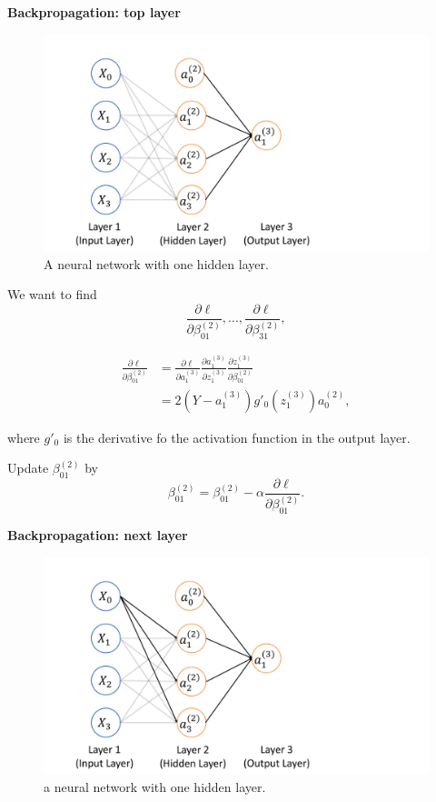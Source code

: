 \documentclass[]{book}
\begin{document}
\textbf{Backpropagation: top layer}

\begin{figure}

{\centering \includegraphics[width=0.5\linewidth]{figures/back_1} 

}

\caption{A neural network with one hidden layer.}\label{fig:back1}
\end{figure}

We want to find \[
\frac{\partial \ell}{\partial \beta_{01}^{(2)}}, \ldots, \frac{\partial \ell}{\partial \beta_{31}^{(2)}},
\]

\begin{align*}
\frac{\partial \ell}{\partial \beta_{01}^{(2)}} & = \frac{\partial \ell}{\partial a_1^{(3)}}
\frac{\partial a_1^{(3)}}{\partial z_1^{(3)}} \frac{\partial z_1^{(3)}}{\partial \beta_{01}^{(2)}}\\
& = 2(Y-a_1^{(3)})g'_0(z_1^{(3)})a_0^{(2)},
\end{align*}

where \(g'_0\) is the derivative fo the activation function in the
output layer.

Update \(\beta_{01}^{(2)}\) by \[
\beta_{01}^{(2)} = \beta_{01}^{(2)} - \alpha \frac{\partial \ell}{\partial \beta_{01}^{(2)}}.
\]

\textbf{Backpropagation: next layer}

\begin{figure}

{\centering \includegraphics[width=0.5\linewidth]{figures/back_2} 

}

\caption{a neural network with one hidden layer.}\label{fig:back2}
\end{figure}
\end{document}
